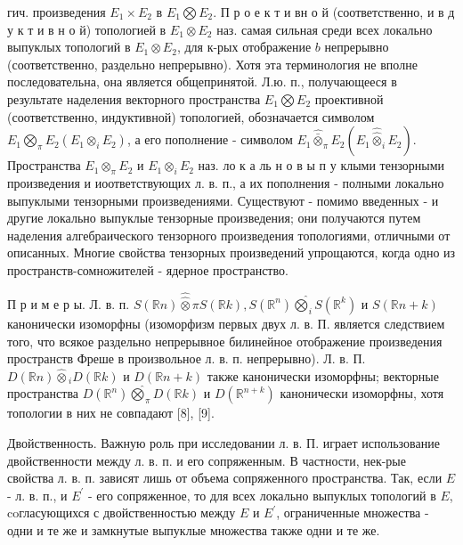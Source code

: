 \documentclass[10pt]{article}
\begin{document}
гич. произведения $E_{1} \times E_{2}$ в $E_{1} \bigotimes E_{2}$. П р о е к т и вн о й (соответственно, и в д у к т и в н о й) топологией в $E_{1} \otimes E_{2}$ наз. самая сильная среди всех локально выпуклых топологий в $E_{1} \otimes E_{2}$, для к-рых отображение $b$ непрерывно (соответственно, раздельно непрерывно). Хотя эта терминология не вполне последовательна, она является общепринятой. Л.ю. п., получающееся в результате наделения векторного пространства $E_{1} \bigotimes E_{2}$ проективной (соответственно, индуктивной) топологией, обозначается символом $E_{1} \bigotimes_{\pi} E_{2}\left(E_{1} \otimes_{i} E_{2}\right)$, а его пополнение - символом $E_{1} \widehat{\bar{\otimes}}_{\pi} E_{2}\left(E_{1} \widehat{\widehat{\otimes}}_{i} E_{2}\right)$. Пространства $E_{1} \otimes_{\pi} E_{2}$ и $E_{1} \otimes_{i} E_{2}$ наз. ло к а ль н о в ы п у клыми тензорными произведения и иоответствующих л. в. п., а их пополнения - полными локально выпуклыми тензорными произведениями. Существуют - помимо введенных - и другие локально выпуклые тензорные произведения; они получаются путем наделения алгебраического тензорного произведения топологиями, отличными от описанных. Многие свойства тензорных произведений упрощаются, когда одно из пространств-сомножителей - ядерное пространство.



П р и м е р ы. Л. в. п. $S(\mathbb{R} n) \widehat{\widehat{\otimes}} \pi S(\mathbb{R} k), S\left(\mathbb{R}^{n}\right) \hat{\bigotimes}_{i} S\left(\mathbb{R}^{k}\right)$ и $S(\mathbb{R} n+k)$ канонически изоморфны (изоморфизм первых двух л. в. П. является следствием того, что всякое раздельно непрерывное билинейное отображение произведения пространств Фреше в произвольное л. в. п. непрерывно). Л. в. П. $D(\mathbb{R} n) \widehat{\otimes}{ }_{i} D(\mathbb{R} k)$ и $D(\mathbb{R} n+k)$ также канонически изоморфны; векторные пространства $D\left(\mathbb{R}^{n}\right) \hat{\bigotimes}_{\pi} D(\mathbb{R} k)$ и $D\left(\mathbb{R}^{n+k}\right)$ канонически изоморфны, хотя топологии в них не совпадают [8], [9].



Двойственность. Важную роль при исследовании л. в. П. играет использование двойственности между л. в. п. и его сопряженным. В частности, нек-рые свойства л. в. п. зависят лишь от объема сопряженного пространства. Так, если $E$ - л. в. п., и $E^{\prime}$ - его сопряженное, то для всех локально выпуклых топологий в $E$, coгласующихся с двойственностью между $E$ и $E^{\prime}$, ограниченные множества - одни и те же и замкнутые выпуклые множества также одни и те же.
\end{document}
